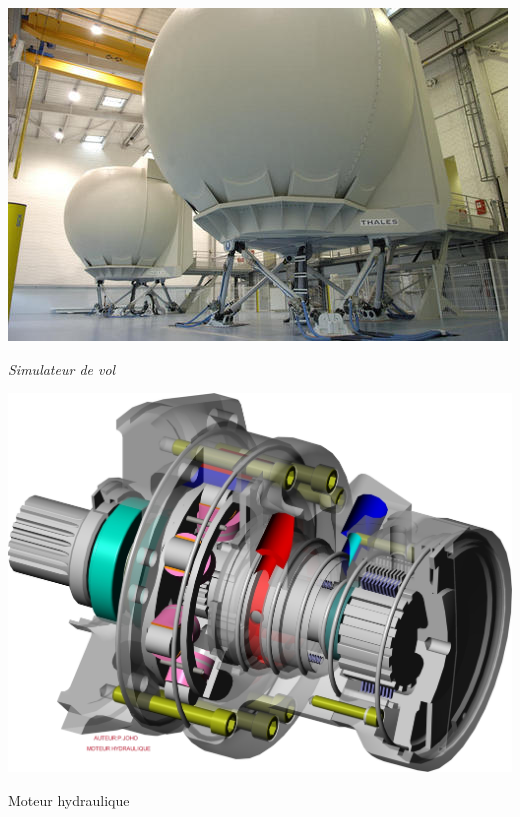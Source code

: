 \documentclass[10pt]{article}
\begin{document}
\begin{minipage}[c]{.23\linewidth}
\begin{center}
\includegraphics[width=.95\textwidth]{images/simulateur}

\textit{Simulateur de vol \cite{simulateur}}
\end{center}
\end{minipage} \hfill
\begin{minipage}[c]{.23\linewidth}
\begin{center}
\includegraphics[width=.95\textwidth]{images/MoteurHydraulique}

Moteur hydraulique \cite{mh}
\end{center}
\end{minipage} 


\setlength{\parskip}{0ex plus 0.2ex minus 0ex}
 \renewcommand{\contentsname}{}
 \renewcommand{\baselinestretch}{1}
\end{document}
